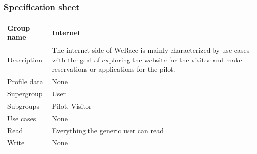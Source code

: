 \documentclass{beamer}
\newcommand{\kc}{WeRace}
\begin{document}
\begin{frame}
    \frametitle{Specification sheet}
    \begin{table}
        \tiny
        \begin{tabular}{|p{2cm}|p{6cm}|}
        \hline
        Group name & \textbf{Internet} \\
        \hline
        Description & The internet side of \kc{} is mainly characterized by use cases with the 
        goal of exploring the website for the visitor and make reservations or applications for 
        the pilot. \\
        \hline
        Profile data & None \\
        \hline
        Supergroup & User \\
        \hline
        Subgroups & Pilot, Visitor \\
        \hline
        Use cases & None \\
        \hline
        Read & Everything the generic user can read \\
        \hline
        Write & None \\
        \hline
        \end{tabular}
    \end{table}
\end{frame}
\end{document}
